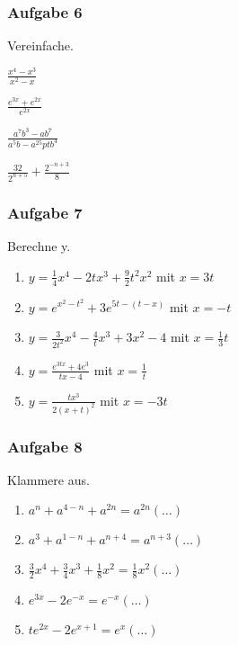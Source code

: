 \subsubsection{Aufgabe 6}
Vereinfache.
\begin{enumerate}
\begin{multicols}{2}
	\item \quad $ \frac{x^4-x^3}{x^2-x} $
	\item \quad $ \frac{e^{3x}+e^{2x}}{e^{2x}} $
	\item \quad $ \frac{a^7b^3-ab^7}{a^5b-a^25ptb^4} $
	\item \quad $ \frac{32}{2^{n+5}} + \frac{2^{-n+3}}{8} $
\end{multicols}
\end{enumerate}

\subsubsection{Aufgabe 7}
Berechne y.
\begin{enumerate}
	\item \quad $ y = \frac{1}{4}x^4-2tx^3+\frac{9}{2}t^2x^2 $ mit $ x = 3t $
	\item \quad $ y = e^{x^2-t^2}+3e^{5t-(t-x)} $ mit $ x = -t $
	\item \quad $ y = \frac{3}{2t^2}x^4 - \frac{4}{t}x^3 + 3x^2 - 4 $ mit $ x = \frac{1}{3}t $
	\item \quad $ y = \frac{e^{3tx}+4e^3}{tx-4} $ mit $ x = \frac{1}{t} $
	\item \quad $ y = \frac{tx^3}{2(x+t)^2} $ mit $x = -3t $ 
\end{enumerate}

\subsubsection{Aufgabe 8}
Klammere aus.
\begin{enumerate}
	\item \quad $ a^n+a^{4-n}+a^{2n} = a^{2n}(\ldots) $
	\item \quad $ a^3 + a^{1-n} + a^{n+4} = a^{n+3}(\ldots) $
	\item \quad $ \frac{3}{2}x^4+\frac{3}{4}x^3+\frac{1}{8}x^2 = \frac{1}{8}x^2(\ldots) $
	\item \quad $ e^{3x}-2e^{-x} = e^{-x}(\ldots) $
	\item \quad $ te^{2x}-2e^{x+1} = e^x(\ldots) $
\end{enumerate}
\newpage
